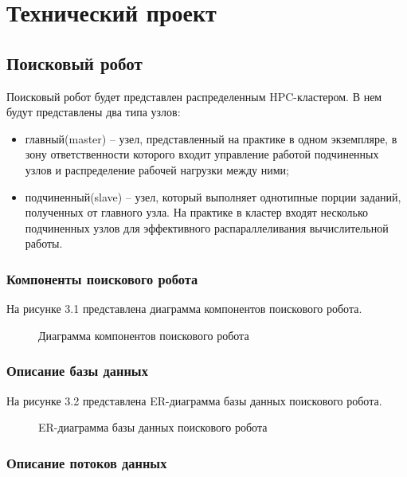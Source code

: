 \newsection
\section{Технический проект}

\subsection{Поисковый робот}

Поисковый робот будет представлен распределенным HPC-кластером. В нем будут представлены два типа узлов:
\begin{itemize}
\item главный(master) -- узел, представленный на практике в одном экземпляре, в зону ответственности которого входит управление работой подчиненных узлов и распределение рабочей нагрузки между ними;
\item подчиненный(slave) -- узел, который выполняет однотипные порции заданий, полученных от главного узла. На практике в кластер входят несколько подчиненных узлов для эффективного распараллеливания вычислительной работы.
\end{itemize}

\subsubsection{Компоненты поискового робота}

На рисунке 3.1 представлена диаграмма компонентов поискового робота.

\begin{figure}
\caption{Диаграмма компонентов поискового робота}
\label{robot/diagram_components:image}
\end{figure}

\subsubsection{Описание базы данных}

На рисунке 3.2 представлена ER-диаграмма базы данных поискового робота.

\begin{figure}
\caption{ER-диаграмма базы данных поискового робота}
\label{robot/robot_db:image}
\end{figure}

\subsubsection{Описание потоков данных}


